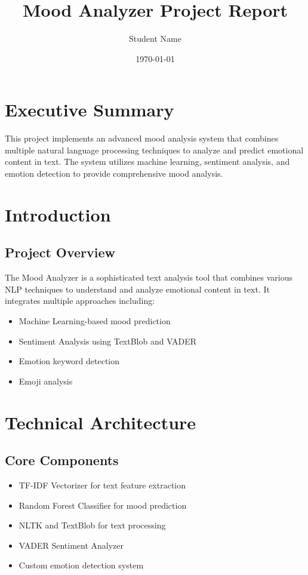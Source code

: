 \documentclass[12pt]{article}
\title{Mood Analyzer Project Report}
\author{Student Name}
\date{\today}
\begin{document}
\maketitle
\tableofcontents
\newpage

\section{Executive Summary}
This project implements an advanced mood analysis system that combines multiple natural language processing techniques to analyze and predict emotional content in text. The system utilizes machine learning, sentiment analysis, and emotion detection to provide comprehensive mood analysis.

\section{Introduction}
\subsection{Project Overview}
The Mood Analyzer is a sophisticated text analysis tool that combines various NLP techniques to understand and analyze emotional content in text. It integrates multiple approaches including:
\begin{itemize}
    \item Machine Learning-based mood prediction
    \item Sentiment Analysis using TextBlob and VADER
    \item Emotion keyword detection
    \item Emoji analysis
\end{itemize}

\section{Technical Architecture}
\subsection{Core Components}
\begin{itemize}
    \item TF-IDF Vectorizer for text feature extraction
    \item Random Forest Classifier for mood prediction
    \item NLTK and TextBlob for text processing
    \item VADER Sentiment Analyzer
    \item Custom emotion detection system
\end{itemize}
\end{document}
